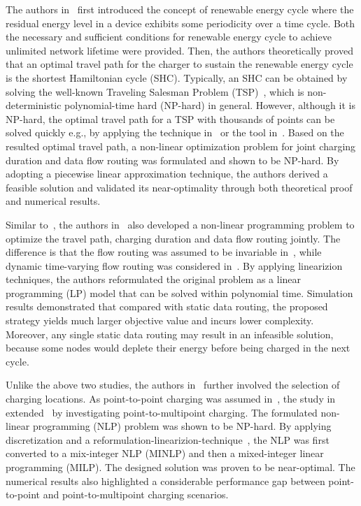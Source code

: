 \documentclass[twocolumn,10pt]{IEEEtran}
\begin{document}
The authors in~\cite{L2012Xie} first introduced the concept of renewable energy cycle where the residual energy level in a device exhibits some periodicity over a time cycle. Both the necessary and sufficient conditions for renewable energy cycle to achieve unlimited network lifetime were provided. Then, the authors theoretically proved that an optimal travel path for the charger to sustain the renewable energy cycle is the shortest Hamiltonian cycle (SHC). Typically, an SHC can be obtained by solving the well-known Traveling Salesman Problem (TSP)~\cite{M.1991Padberg}, which is non-deterministic polynomial-time hard (NP-hard) in general.
However, although it is NP-hard, the optimal travel path for a TSP with thousands of points can be solved quickly e.g., by applying the technique in~\cite{M.1991Padberg}  or the tool in~\cite{Concorde}. Based on the resulted optimal travel path, a non-linear optimization problem for joint charging duration and data flow routing was formulated and shown to be NP-hard. By adopting a piecewise linear approximation technique, the authors derived a feasible solution and validated its near-optimality through both theoretical proof and numerical results.


Similar to~\cite{L2012Xie}, the authors in~\cite{L.2014Shi} also developed a non-linear programming problem to optimize the travel path, charging duration and data flow routing jointly. The difference is that the flow routing was assumed to be invariable in~\cite{L2012Xie}, while dynamic time-varying flow routing was considered in~\cite{L.2014Shi}.  
By applying linearizion techniques, the authors reformulated the original problem as a linear programming (LP) model that can be solved within polynomial time. Simulation results demonstrated that compared with static data routing, the proposed strategy yields much larger objective value and incurs lower complexity. Moreover, any single static data routing may result in an infeasible solution, because some nodes would deplete their energy before being charged in the next cycle.

Unlike the above two studies, the authors in~\cite{L2014Xie,LXie2013,L2013Xie} further involved the selection of charging locations. As point-to-point charging was assumed in~\cite{L2012Xie}, the study in~\cite{L2014Xie} extended~\cite{L2012Xie} by investigating point-to-multipoint charging. The formulated  non-linear programming (NLP) problem was shown to be NP-hard. By applying discretization and a reformulation-linearizion-technique~\cite{D.1998Sherali}, the NLP was first converted to a mix-integer NLP (MINLP) and then a mixed-integer linear programming (MILP). The designed solution was proven to be near-optimal. The numerical results also highlighted a considerable performance gap between point-to-point and point-to-multipoint charging scenarios.
\end{document}
